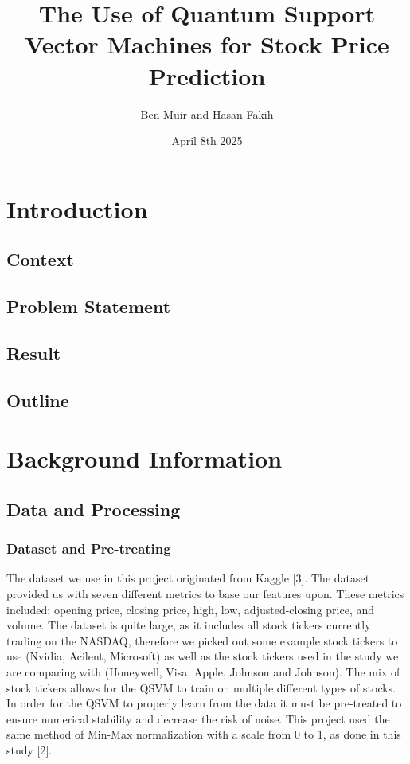 \documentclass{article}
\title{The Use of Quantum Support Vector Machines for Stock Price Prediction}
\author{Ben Muir and Hasan Fakih}
\date{April 8th 2025}
\begin{document}
\maketitle

\section*{Introduction}
\subsection*{Context}
\subsection*{Problem Statement}
\subsection*{Result}
\subsection*{Outline}
\section*{Background Information}

\subsection*{Data and Processing}
\subsubsection*{Dataset and Pre-treating}
The dataset we use in this project originated from Kaggle [3]. The dataset provided us with seven different metrics to base our features upon. These metrics included: opening price, closing price, high, low, adjusted-closing price, and volume. The dataset is quite large, as it includes all stock tickers currently trading on the NASDAQ, therefore we picked out some example stock tickers to use (Nvidia, Acilent, Microsoft) as well as the stock tickers used in the study we are comparing with (Honeywell, Visa, Apple, Johnson and Johnson). The mix of stock tickers allows for the QSVM to train on multiple different types of stocks. In order for the QSVM to properly learn from the data it must be pre-treated to ensure numerical stability and decrease the risk of noise. This project used the same method of Min-Max normalization with a scale from 0 to 1, as done in this study [2]. 
\end{document}
